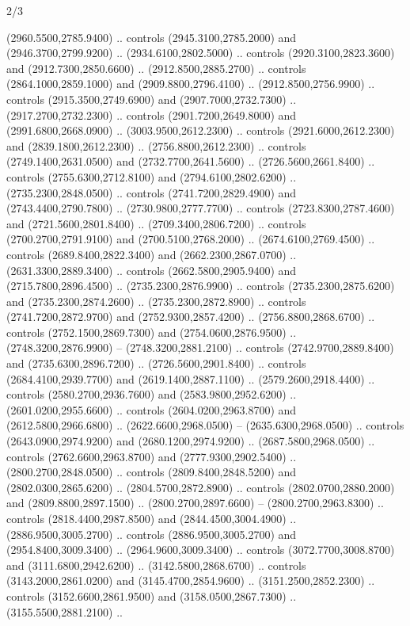\begin{flagdescription}{2/3}
\begin{scope}[shift={(0.5\flaglength,0.5)},scale=\flagwidth/130]
\begin{scope}[y=0.01mm, x=0.01mm,shift={(-3365,-2250)}]
  (2960.5500,2785.9400) .. controls (2945.3100,2785.2000) and
  (2946.3700,2799.9200) .. (2934.6100,2802.5000) .. controls
  (2920.3100,2823.3600) and (2912.7300,2850.6600) .. (2912.8500,2885.2700) ..
  controls (2864.1000,2859.1000) and (2909.8800,2796.4100) ..
  (2912.8500,2756.9900) .. controls (2915.3500,2749.6900) and
  (2907.7000,2732.7300) .. (2917.2700,2732.2300) .. controls
  (2901.7200,2649.8000) and (2991.6800,2668.0900) .. (3003.9500,2612.2300) ..
  controls (2921.6000,2612.2300) and (2839.1800,2612.2300) ..
  (2756.8800,2612.2300) .. controls (2749.1400,2631.0500) and
  (2732.7700,2641.5600) .. (2726.5600,2661.8400) .. controls
  (2755.6300,2712.8100) and (2794.6100,2802.6200) .. (2735.2300,2848.0500) ..
  controls (2741.7200,2829.4900) and (2743.4400,2790.7800) ..
  (2730.9800,2777.7700) .. controls (2723.8300,2787.4600) and
  (2721.5600,2801.8400) .. (2709.3400,2806.7200) .. controls
  (2700.2700,2791.9100) and (2700.5100,2768.2000) .. (2674.6100,2769.4500) ..
  controls (2689.8400,2822.3400) and (2662.2300,2867.0700) ..
  (2631.3300,2889.3400) .. controls (2662.5800,2905.9400) and
  (2715.7800,2896.4500) .. (2735.2300,2876.9900) .. controls
  (2735.2300,2875.6200) and (2735.2300,2874.2600) .. (2735.2300,2872.8900) ..
  controls (2741.7200,2872.9700) and (2752.9300,2857.4200) ..
  (2756.8800,2868.6700) .. controls (2752.1500,2869.7300) and
  (2754.0600,2876.9500) .. (2748.3200,2876.9900) -- (2748.3200,2881.2100) ..
  controls (2742.9700,2889.8400) and (2735.6300,2896.7200) ..
  (2726.5600,2901.8400) .. controls (2684.4100,2939.7700) and
  (2619.1400,2887.1100) .. (2579.2600,2918.4400) .. controls
  (2580.2700,2936.7600) and (2583.9800,2952.6200) .. (2601.0200,2955.6600) ..
  controls (2604.0200,2963.8700) and (2612.5800,2966.6800) ..
  (2622.6600,2968.0500) -- (2635.6300,2968.0500) .. controls
  (2643.0900,2974.9200) and (2680.1200,2974.9200) .. (2687.5800,2968.0500) ..
  controls (2762.6600,2963.8700) and (2777.9300,2902.5400) ..
  (2800.2700,2848.0500) .. controls (2809.8400,2848.5200) and
  (2802.0300,2865.6200) .. (2804.5700,2872.8900) .. controls
  (2802.0700,2880.2000) and (2809.8800,2897.1500) .. (2800.2700,2897.6600) --
  (2800.2700,2963.8300) .. controls (2818.4400,2987.8500) and
  (2844.4500,3004.4900) .. (2886.9500,3005.2700) .. controls
  (2886.9500,3005.2700) and (2954.8400,3009.3400) .. (2964.9600,3009.3400) ..
  controls (3072.7700,3008.8700) and (3111.6800,2942.6200) ..
  (3142.5800,2868.6700) .. controls (3143.2000,2861.0200) and
  (3145.4700,2854.9600) .. (3151.2500,2852.2300) .. controls
  (3152.6600,2861.9500) and (3158.0500,2867.7300) .. (3155.5500,2881.2100) ..

\end{scope}
\end{scope}
\end{flagdescription}
